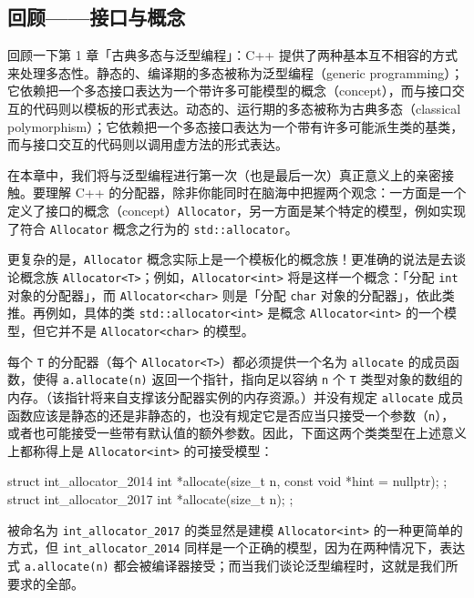 \subsection{回顾——接口与概念}

回顾一下第 1 章「古典多态与泛型编程」：C++ 提供了两种基本互不相容的方式来处理多态性。静态的、编译期的多态被称为泛型编程（generic programming）；它依赖把一个多态接口表达为一个带许多可能模型的概念（concept），而与接口交互的代码则以模板的形式表达。动态的、运行期的多态被称为古典多态（classical polymorphism）；它依赖把一个多态接口表达为一个带有许多可能派生类的基类，而与接口交互的代码则以调用虚方法的形式表达。

在本章中，我们将与泛型编程进行第一次（也是最后一次）真正意义上的亲密接触。要理解 C++ 的分配器，除非你能同时在脑海中把握两个观念：一方面是一个定义了接口的概念（concept）\texttt{Allocator}，另一方面是某个特定的模型，例如实现了符合 \texttt{Allocator} 概念之行为的 \texttt{std::\allowbreak{}allocator}。

更复杂的是，\texttt{Allocator} 概念实际上是一个模板化的概念族！更准确的说法是去谈论概念族 \texttt{Allocator<\allowbreak{}T>\allowbreak{}}；例如，\texttt{Allocator<\allowbreak{}int>\allowbreak{}} 将是这样一个概念：「分配 \texttt{int} 对象的分配器」，而 \texttt{Allocator<\allowbreak{}char>\allowbreak{}} 则是「分配 \texttt{char} 对象的分配器」，依此类推。再例如，具体的类 \texttt{std::\allowbreak{}allocator<\allowbreak{}int>\allowbreak{}} 是概念 \texttt{Allocator<\allowbreak{}int>\allowbreak{}} 的一个模型，但它并不是 \texttt{Allocator<\allowbreak{}char>\allowbreak{}} 的模型。

每个 \texttt{T} 的分配器（每个 \texttt{Allocator<\allowbreak{}T>\allowbreak{}}）都必须提供一个名为 \texttt{allocate} 的成员函数，使得 \texttt{a.\allowbreak{}allocate(\allowbreak{}n)\allowbreak{}} 返回一个指针，指向足以容纳 \texttt{n} 个 \texttt{T} 类型对象的数组的内存。（该指针将来自支撑该分配器实例的内存资源。）并没有规定 \texttt{allocate} 成员函数应该是静态的还是非静态的，也没有规定它是否应当只接受一个参数（\texttt{n}），或者也可能接受一些带有默认值的额外参数。因此，下面这两个类类型在上述意义上都称得上是 \texttt{Allocator<\allowbreak{}int>\allowbreak{}} 的可接受模型：

\begin{codebox}[cpp]
    struct int_allocator_2014 {
      int *allocate(size_t n, const void *hint = nullptr);
    };
    struct int_allocator_2017 {
      int *allocate(size_t n);
    };
\end{codebox}

被命名为 \texttt{int\_\allowbreak{}allocator\_\allowbreak{}2017} 的类显然是建模 \texttt{Allocator<\allowbreak{}int>\allowbreak{}} 的一种更简单的方式，但 \texttt{int\_\allowbreak{}allocator\_\allowbreak{}2014} 同样是一个正确的模型，因为在两种情况下，表达式 \texttt{a.\allowbreak{}allocate(\allowbreak{}n)\allowbreak{}} 都会被编译器接受；而当我们谈论泛型编程时，这就是我们所要求的全部。

